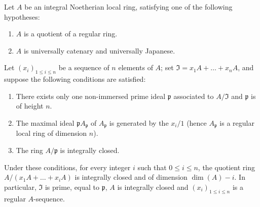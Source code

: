 \begin{corollary}[5.12.10]
\label{IV.5.12.10}
Let $A$ be an integral Noetherian local ring, satisfying one of the following hypotheses:
\begin{enumerate}
  \item[\rm a)] $A$ is a quotient of a regular ring.
  \item[\rm b)] $A$ is universally catenary and universally Japanese.
\end{enumerate}
Let $(x_i)_{1\leqslant i\leqslant n}$ be a sequence of $n$ elements of $A$; set $\mathfrak{I}=x_1A+\ldots+x_nA$, and suppose the following conditions are satisfied:
\begin{enumerate}
  \item[\rm(i)] There exists only one non-immersed prime ideal $\mathfrak{p}$ associated to $A/\mathfrak{I}$ and $\mathfrak{p}$ is of height $n$.
  \item[\rm(ii)] The maximal ideal $\mathfrak{p}A_\mathfrak{p}$ of $A_\mathfrak{p}$ is generated by the $x_i/1$ (hence $A_\mathfrak{p}$ is a regular local ring of dimension $n$).
  \item[\rm(iii)] The ring $A/\mathfrak{p}$ is integrally closed.
\end{enumerate}
Under these conditions, for every integer $i$ such that $0\leqslant i\leqslant n$, the quotient ring $A/(x_1A+\ldots+x_iA)$ is integrally closed and of dimension $\dim(A)-i$.
In particular, $\mathfrak{I}$ is prime, equal to $\mathfrak{p}$, $A$ is integrally closed and $(x_i)_{1\leqslant i\leqslant n}$ is a regular $A$-sequence.
\end{corollary}

